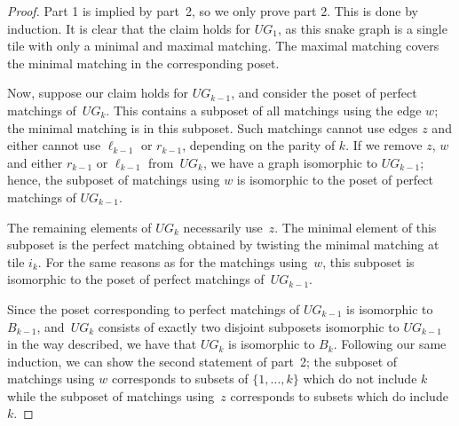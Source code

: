 \documentclass[pdftex]{sigma}%
\numberwithin{equation}{section}
\begin{document}
\begin{proof}Part 1 is implied by part~2, so we only prove part 2. This is done by induction. It is clear that the claim holds for $UG_1$, as this snake graph is a single tile with only a minimal and maximal matching. The maximal matching covers the minimal matching in the corresponding poset.

Now, suppose our claim holds for $UG_{k-1}$, and consider the poset of perfect matchings of~$UG_k$. This contains a subposet of all matchings using the edge $w$; the minimal matching is in this subposet. Such matchings cannot use edges $z$ and either cannot use $\ell_{k-1}$ or $r_{k-1}$, depending on the parity of $k$. If we remove $z$, $w$ and either $r_{k-1}$ or $\ell_{k-1}$ from~$UG_k$, we have a graph isomorphic to $UG_{k-1}$; hence, the subposet of matchings using $w$ is isomorphic to the poset of perfect matchings of $UG_{k-1}$.

The remaining elements of $UG_{k}$ necessarily use~$z$. The minimal element of this subposet is the perfect matching obtained by twisting the minimal matching at tile $i_k$. For the same reasons as for the matchings using~$w$, this subposet is isomorphic to the poset of perfect matchings of~$UG_{k-1}$.

 Since the poset corresponding to perfect matchings of $UG_{k-1}$ is isomorphic to~$B_{k-1}$, and~$UG_k$ consists of exactly two disjoint subposets isomorphic to $UG_{k-1}$ in the way described, we have that $UG_k$ is isomorphic to $B_k$. Following our same induction, we can show the second statement of part~2; the subposet of matchings using $w$ corresponds to subsets of $\{1,\ldots, k\}$ which do not include $k$ while the subposet of matchings using~$z$ corresponds to subsets which do include~$k$.
\end{proof}
\end{document}
